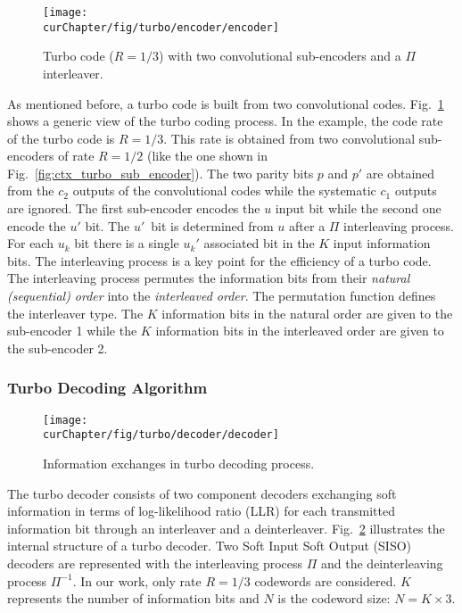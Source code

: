 \begin{figure}[htp]
  \centering
  \texttt{[image: \\curChapter/fig/turbo/encoder/encoder]}
  \caption{Turbo code ($R = 1/3$) with two convolutional sub-encoders and a
    $\Pi$ interleaver.}
  \label{fig:ctx_turbo_encoder}
\end{figure}

As mentioned before, a turbo code is built from two convolutional codes.
Fig.~\ref{fig:ctx_turbo_encoder} shows a generic view of the turbo coding
process. In the example, the code rate of the turbo code is $R = 1/3$. This rate
is obtained from two convolutional sub-encoders of rate $R = 1/2$ (like the one
shown in Fig.~\ref{fig:ctx_turbo_sub_encoder}). The two parity bits $p$ and $p'$
are obtained from the $c_2$ outputs of the convolutional codes while the
systematic $c_1$ outputs are ignored. The first sub-encoder encodes the $u$
input bit while the second one encode the $u'$ bit. The $u'$~bit is determined
from $u$ after a $\Pi$ interleaving process. For each $u_k$ bit there is a
single $u_k'$ associated bit in the $K$ input information bits. The interleaving
process is a key point for the efficiency of a turbo code.
The interleaving process permutes the information bits from their \emph{natural
(sequential) order} into the \emph{interleaved order}.
The permutation function defines the interleaver type. The $K$ information bits
in the natural order are given to the sub-encoder 1 while the $K$ information
bits in the interleaved order are given to the sub-encoder 2.

\subsubsection{Turbo Decoding Algorithm}
\label{sec:turbo_overview}

\begin{figure}[htp]
  \centering
  \texttt{[image: \\curChapter/fig/turbo/decoder/decoder]}
  \caption{Information exchanges in turbo decoding process.}
  \label{fig:ctx_turbo_decoder}
\end{figure}

The turbo decoder consists of two component decoders exchanging soft information
in terms of log-likelihood ratio (LLR) for each transmitted information bit
through an interleaver and a deinterleaver. Fig.~\ref{fig:ctx_turbo_decoder}
illustrates the internal structure of a turbo decoder. Two Soft Input Soft
Output (SISO) decoders are represented with the interleaving process $\Pi$ and
the deinterleaving process $\Pi^{-1}$. In our work, only rate $R = 1/3$
codewords are considered. $K$ represents the number of information bits and $N$
is the codeword size: $N = K \times 3$.

